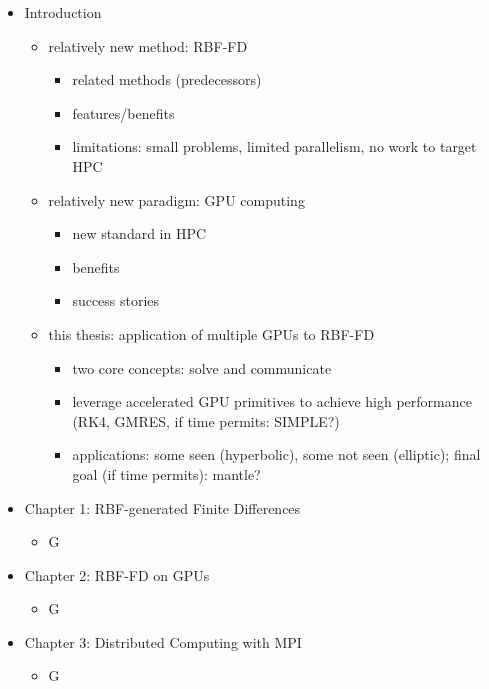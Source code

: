 \begin{itemize} 
	\item Introduction
	\begin{itemize}
		\item relatively new method: RBF-FD 
		\begin{itemize} 
			\item related methods (predecessors)
			\item features/benefits
			\item limitations: small problems, limited parallelism, no work to target HPC
		\end{itemize}
		\item relatively new paradigm: GPU computing
		\begin{itemize} 
			\item new standard in HPC
			\item benefits
			\item success stories
		\end{itemize} 
		\item this thesis: application of multiple GPUs to RBF-FD
		\begin{itemize} 
			\item two core concepts: solve and communicate
			\item leverage accelerated GPU primitives to achieve high performance (RK4, GMRES, if time permits: SIMPLE?)
			\item applications: some seen (hyperbolic), some not seen (elliptic); final goal (if time permits): mantle?
		\end{itemize} 
	\end{itemize}
\end{itemize}


\begin{itemize}
	\item Chapter 1: RBF-generated Finite Differences
	\begin{itemize} 
		\item G
	\end{itemize} 
\end{itemize}
	
\begin{itemize}
	\item Chapter 2: RBF-FD on GPUs
	\begin{itemize} 
		\item G
	\end{itemize} 
\end{itemize}

\begin{itemize}
	\item Chapter 3: Distributed Computing with MPI
	\begin{itemize} 
		\item G
	\end{itemize} 
\end{itemize}

